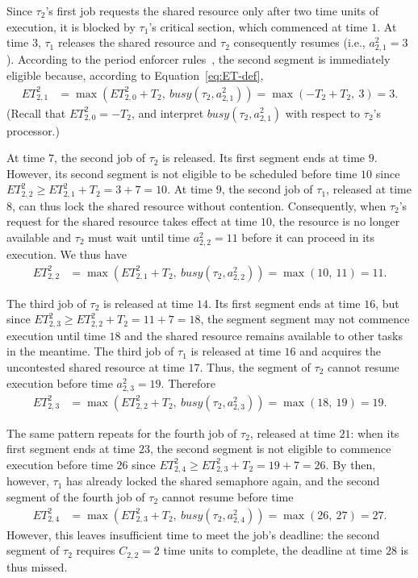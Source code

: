 Since $\tau_2$'s first job requests the shared resource only after two time units of execution, it is blocked by $\tau_1$'s critical section, which commenced at time $1$. At time $3$, $\tau_1$ releases the shared resource and $\tau_2$ consequently resumes (i.e., $a^2_{2,1} = 3$). According to the period enforcer rules~\cite{Raj:suspension1991}, the second segment is immediately eligible because, according to Equation~\ref{eq:ET-def},
\begin{align*}
	ET_{2,1}^2 & = \max\left(ET_{2,0}^2 + T_2,\ \mathit{busy}(\tau_2, a^2_{2,1})\right) =\max(-T_2 + T_2,\ 3) = 3.
\end{align*}
(Recall that $ET_{2,0}^2 = -T_2$, and interpret $\mathit{busy}(\tau_2, a^2_{2,1})$ with respect to $\tau_2$'s processor.)


At time $7$, the second job of $\tau_2$ is released. Its first segment ends at time $9$. However, its second segment is not eligible to be scheduled before time $10$ since $ET_{2,2}^2 \geq ET_{2,1}^2 + T_2 = 3 + 7 = 10$. At time $9$, the second job of $\tau_1$, released at time $8$, can thus lock the shared resource without contention. Consequently, when $\tau_2$'s request for the shared resource takes effect at time $10$, the resource is no longer available and $\tau_2$ must wait until time $a^2_{2,2} = 11$ before it can proceed in its execution. We thus have
\begin{align*}
	ET_{2,2}^2 & = \max\left(ET_{2,1}^2 + T_2,\ \mathit{busy}(\tau_2, a^2_{2,2})\right) =\max(10,\ 11) = 11.
\end{align*}

The third job of $\tau_2$ is released at time $14$. Its first segment ends at time $16$, but since $ET_{2,3}^2 \geq ET_{2,2}^2 + T_2 = 11 + 7 = 18$, the segment segment may not commence execution until time $18$ and the shared resource remains available to other tasks in the meantime. The third job of $\tau_1$ is released at time $16$ and acquires the uncontested shared resource at time $17$. Thus, the segment of $\tau_2$ cannot resume execution before time $a^2_{2,3} = 19$. Therefore
\begin{align*}
	ET_{2,3}^2 & = \max\left(ET_{2,2}^2 + T_2,\ \mathit{busy}(\tau_2, a^2_{2,3})\right) =\max(18,\ 19) = 19.
\end{align*}

The same pattern repeats for the fourth job of $\tau_2$, released at time $21$: when its first segment ends at time $23$, the second segment is not eligible to commence execution before time $26$ since $ET_{2,4}^2 \geq ET_{2,3}^2 + T_2 = 19 + 7 = 26$. By then, however, $\tau_1$ has already locked the shared semaphore again, and the second segment of the fourth job of $\tau_2$ cannot resume before time
\begin{align*}
	ET_{2,4}^2 & = \max\left(ET_{2,3}^2 + T_2,\ \mathit{busy}(\tau_2, a^2_{2,4})\right) =\max(26,\ 27) = 27.
\end{align*}
However, this leaves insufficient time to meet the job's deadline: the second segment of $\tau_2$ requires $C_{2,2} = 2$ time units to complete, the deadline at time $28$ is thus missed.

